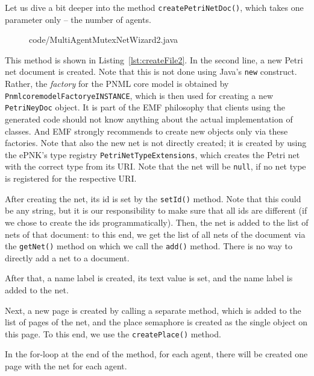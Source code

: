 %
Let us dive a bit deeper into the method {\tt createPetriNetDoc()}, which
takes one parameter only -- the number of agents.
%
\begin{figure}[htbp!]
%
  {code/MultiAgentMutexNetWizard2.java}
\end{figure}
%
This method is shown in Listing~\ref{lst:createFile2}. In the
second line, a new Petri net document is created. Note that this is not done
using Java's {\tt new} construct. Rather, the \emph{factory}%
for the PNML core model is obtained by
{\tt Pnmlcoremodel\optsep{}Factory\qnsep{}eINSTANCE},%
which is then used for creating a new {\tt PetriNeyDoc} object. It is part of the
EMF philosophy that clients using the generated code should not know anything about
the actual implementation of classes. And EMF strongly recommends to create
new objects only via these factories.
Note that also the new net is not directly created; it is created by
using the ePNK's type registry {\tt PetriNetTypeExtensions},%
which creates the Petri net with the correct type from its URI. Note that the
net will be {\tt null}, if no net type is registered for the respective URI.

After creating the net, its id is set by the {\tt setId()} method. Note that this
could be any string, but it is our responsibility to make sure that all ids
are different (if we chose to create the ids programmatically). Then, the net is
added to the list of nets of that document: to this end, we get
the list of all nets of the document via the {\tt getNet()} method on which we
call the {\tt add()} method. There is no way to directly add a net to
a document. 

After that, a name label is created, its text value is set, and the
name label is added to the net. 

Next, a new page is created by calling a separate method, which is added
to the list of pages of the net, and the place semaphore is created
as the single object on this page. To this end, we use the
{\tt createPlace()} method. 

In the for-loop at the end of the method, for each agent, there
will be created one page with the net for each agent.


